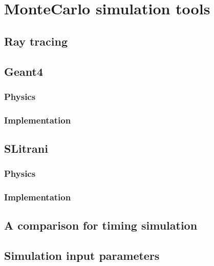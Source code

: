
\chapter{MonteCarlo simulation tools}

\section{Ray tracing}

\section{Geant4}
\subsection{Physics}
\subsection{Implementation}

\section{SLitrani}
\subsection{Physics}
\subsection{Implementation}

\section{A comparison for timing simulation}

\section{Simulation input parameters}
